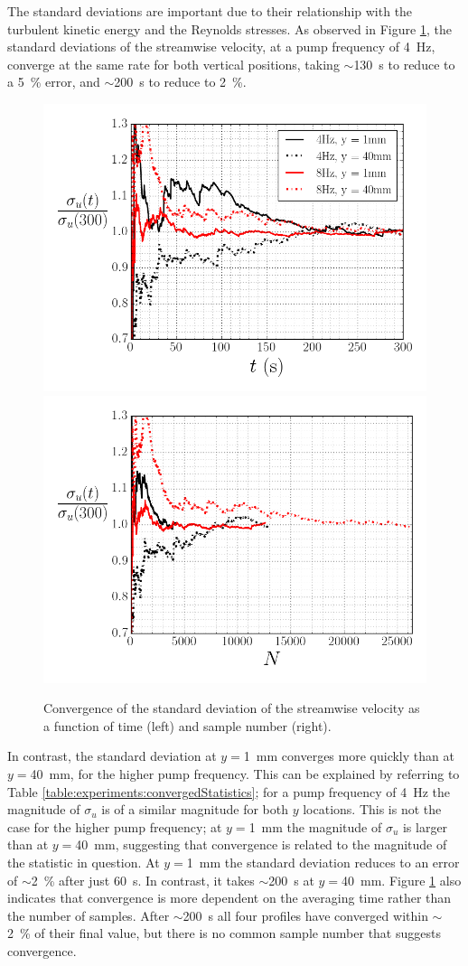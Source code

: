 \documentclass[12pt,oneside,a4paper]{article}
\begin{document}
The standard deviations are important due to their relationship with the turbulent kinetic energy and the Reynolds stresses. As observed in Figure \ref{figure:experiments:timeDependence:RMSux}, the standard deviations of the streamwise velocity, at a pump frequency of \SI{4}{Hz}, converge at the same rate for both vertical positions, taking $\sim$\SI{130}{s} to reduce to a \SI{5}{\%} error, and $\sim$\SI{200}{s} to reduce to \SI{2}{\%}. 
%
\begin{figure}[!t]
\centering
\includegraphics[width=0.5\linewidth]{images/LDA_timeDependenceImages/uxRMSTConvergence.png}\hfill
\includegraphics[width=0.5\linewidth]{images/LDA_timeDependenceImages/uxRMSNConvergence.png}\\
\caption{Convergence of the standard deviation of the streamwise velocity as a function of time (left) and sample number (right).}
\label{figure:experiments:timeDependence:RMSux}
\end{figure}
%
In contrast, the standard deviation at $y=$\SI{1}{mm} converges more quickly than at $y=$\SI{40}{mm}, for the higher pump frequency. This can be explained by referring to Table \ref{table:experiments:convergedStatistics}; for a pump frequency of \SI{4}{Hz} the magnitude of $\sigma_u$ is of a similar magnitude for both $y$ locations. This is not the case for the higher pump frequency; at $y=$\SI{1}{mm} the magnitude of $\sigma_u$ is larger than at $y=$\SI{40}{mm}, suggesting that convergence is related to the magnitude of the statistic in question. At $y=$\SI{1}{mm} the standard deviation reduces to an error of $\sim$\SI{2}{\%} after just \SI{60}{s}. In contrast, it takes $\sim$\SI{200}{s} at $y=$\SI{40}{mm}. Figure \ref{figure:experiments:timeDependence:RMSux} also indicates that convergence is more dependent on the averaging time rather than the number of samples. After $\sim$\SI{200}{s} all four profiles have converged within $\sim$\SI{2}{\%} of their final value, but there is no common sample number that suggests convergence. 
\end{document}
